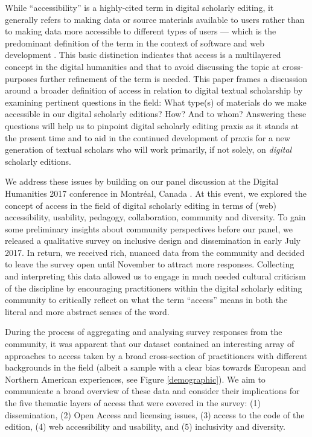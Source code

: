 \begin{paper}
While ``accessibility'' is a highly-cited term in digital scholarly
editing, it generally refers to making data \citep{sahle_criteria_2014} or source
materials \citep[222]{martens_what_1995} available to users rather than to making
data more accessible to different types of users --- which is the
predominant definition of the term in the context of software and web
development \citep{w3c_accessibility_2018}. This basic distinction indicates that access is
a multilayered concept in the digital humanities and that to avoid
discussing the topic at cross-purposes further refinement of the term is
needed. This paper frames a discussion around a broader definition of
access in relation to digital textual scholarship by examining pertinent
questions in the field: What type(s) of materials do we make accessible
in our digital scholarly editions? How? And to whom? Answering these
questions will help us to pinpoint digital scholarly editing praxis as
it stands at the present time and to aid in the continued development of
praxis for a new generation of textual scholars who will work primarily,
if not solely, on \emph{digital} scholarly editions.

We address these issues by building on our panel
discussion at the Digital Humanities 2017 conference in Montréal, Canada
\citep{sichani_refining_2017}. At this event, we explored the concept of access
in the field of digital scholarly editing in terms of (web)
accessibility, usability, pedagogy, collaboration, community and
diversity. To gain some preliminary insights about community
perspectives before our panel, we released a qualitative survey on
inclusive \mbox{design} and dissemination in early July 2017. In return, we
received rich, nuanced data from the community and decided to leave the
survey open until November to attract more responses. Collecting and
interpreting this data allowed us to engage in much needed cultural
criticism of the discipline \citep{fiormonte_towards_2012,liu_where_2012,posner_whats_2016}
by encouraging practitioners within the digital scholarly editing
community to critically reflect on what the term ``access'' means in
both the literal and more abstract senses of the word.

During the process of aggregating and analysing survey responses from
the community, it was apparent that our dataset contained an interesting
array of approaches to access taken by a broad cross-section of
practitioners with different backgrounds in the field (albeit a sample
with a clear bias towards European and Northern American experiences, see Figure \ref{demographic}).
We aim to communicate a broad overview of these data and consider their
implications for the five thematic layers of access that were covered in
the survey: (1) dissemination, (2) Open Access and licensing issues, (3)
access to the code of the edition, (4) web accessibility and usability,
and (5) inclusivity and diversity.


\end{paper}
